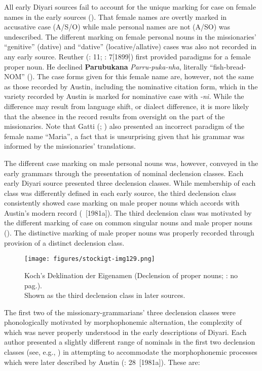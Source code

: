 All early Diyari sources fail to account for the unique marking for case on female names in the early sources (). That female names are overtly marked in accusative case (A/S/O) while male personal names are not (A/SO) was undescribed. The different marking on female personal nouns in the missionaries' “genitive” (dative) and “dative” (locative/allative) cases was also not recorded in any early source. Reuther (\citeyear{reuther_dieri_1894}: 11; \citeyear{reuther_three_1981}: 7[1899]) first provided paradigms for a female proper noun. He declined \textbf{Parubukana} \textit{Parru-puka-nha}, literally “fish-bread-NOM” (). The case forms given for this female name are, however, not the same as those recorded by Austin, including the nominative citation form, which in the variety recorded by Austin is marked for nominative case with \textit{-ni.} While the difference may result from language shift, or dialect difference, it is more likely that the absence in the record results from oversight on the part of the missionaries. Note that Gatti (; ) also presented an incorrect paradigm of the female name “Maria'', a fact that is unsurprising given that his grammar was informed by the missionaries' translations.


The different case marking on male personal nouns was, however, conveyed in the early grammars through the presentation of nominal declension classes. Each early Diyari source presented three declension classes. While membership of each class was differently defined in each early source, the third declension class consistently showed case marking on male proper nouns which accords with Austin’s modern record (\citeyear{austin_grammar_2013}~[1981a]). The third declension class was motivated by the different marking of case on common singular nouns and male proper nouns (). The distinctive marking of male proper nouns was properly recorded through provision of a distinct declension class.


\begin{figure}
\texttt{[image: figures/stockigt-img129.png]}
\caption{Koch's Deklination der Eigenamen (Declension of proper nouns; \citeyear{koch_untitled_1868}: no pag.).\\
Shown as the third declension class in later sources.
\label{bkm:Ref449371888}\label{fig:key:8-180}
}
\end{figure}

\largerpage
The first two of the missionary-grammarians' three declension classes were phonologically motivated by morphophonemic alternation, the complexity of which was never properly understood in the early descriptions of Diyari. Each author presented a slightly different range of nominals in the first two declension classes (see, e.g., ) in attempting to accommodate the morphophonemic processes which were later described by Austin (\citeyear{austin_grammar_2013}: 28~[1981a]). These are:

